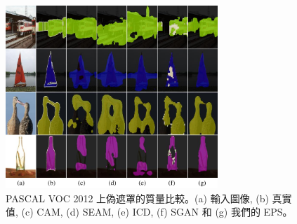 \begin{figure}[t]
\centering
\includegraphics[width=8cm]{figures/fig_ablation.pdf}
\caption{PASCAL VOC 2012 上偽遮罩的質量比較。(a) 輸入圖像, (b) 真實值, (c) CAM, (d) SEAM, (e) ICD, (f) SGAN 和 (g) 我們的 EPS。}
\label{fig:ablation} \vspace{-3mm}
\end{figure}
